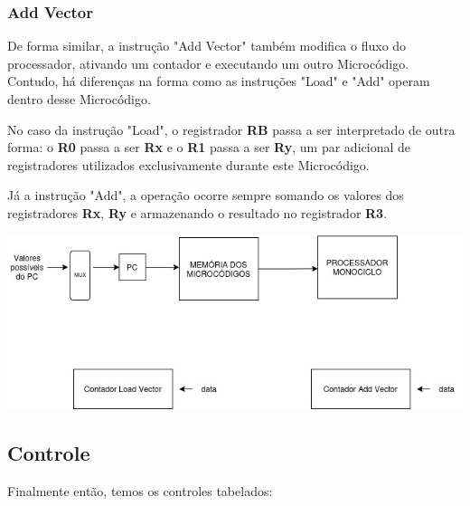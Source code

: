 \documentclass{article}  %
\begin{document}
    \subsubsection{Add Vector}

    De forma similar, a instrução "Add Vector" também modifica o fluxo do processador, ativando um contador e executando um outro Microcódigo. Contudo, há diferenças na forma como as instruções "Load" e "Add" operam dentro desse Microcódigo.
    
    No caso da instrução "Load", o registrador \textbf{RB} passa a ser interpretado de outra forma: o \textbf{R0} passa a ser \textbf{Rx} e o \textbf{R1} passa a ser \textbf{Ry}, um par adicional de registradores utilizados exclusivamente durante este Microcódigo.
    
    Já a instrução "Add", a operação ocorre sempre somando os valores dos registradores \textbf{Rx}, \textbf{Ry} e armazenando o resultado no registrador \textbf{R3}.
    
    \noindent\hspace*{0cm}\includegraphics[scale=0.5]{extensao.jpg}
    \vspace{1cm}   

    \subsection{Controle}

    Finalmente então, temos os controles tabelados:
\end{document}
